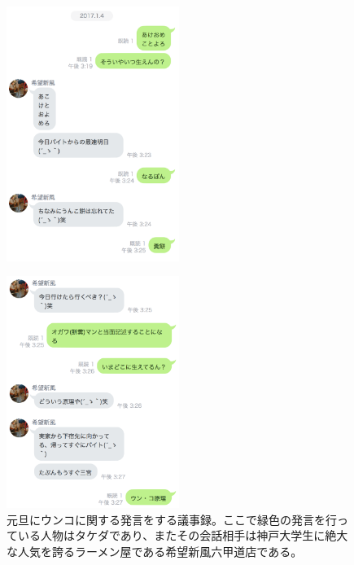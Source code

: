 \begin{figure}[htbp]
\begin{center}
 \begin{minipage}{0.7\hsize}
  \begin{center}
\includegraphics[width=0.5\textwidth]{./section/UnkoGenri/figure/Unko1.png}
  \end{center}
  \label{fig:one}
 \end{minipage}
 \begin{minipage}{0.7\hsize}
  \begin{center}
\includegraphics[width=0.5\textwidth]{./section/UnkoGenri/figure/Unko2.png}
  \end{center}
 \end{minipage}
 \caption{元旦にウンコに関する発言をする議事録。ここで緑色の発言を行っている人物はタケダであり、またその会話相手は神戸大学生に絶大な人気を誇るラーメン屋である希望新風六甲道店である。}
  \label{Fig:Unkogenri}
\end{center}
\end{figure}

